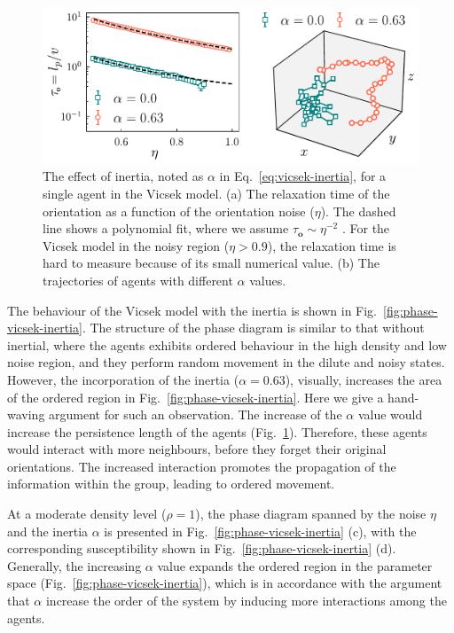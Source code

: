 \documentclass[11pt,twoside]{report}
\begin{document}
\begin{figure}
  \includegraphics[width=\linewidth]{vicsek-inertia}
  \caption[The effect of inertia in the Vicsek model]{
	The effect of inertia, noted as $\alpha$ in Eq.~\ref{eq:vicsek-inertia}, for a single agent in the Vicsek model.
	(a) The relaxation time of the orientation as a function of the orientation noise ($\eta$). The dashed line shows a polynomial fit, where we assume $\tau_\mathbf{o} \sim \eta^{-2}$ \cite{ginelli2016}. For the Vicsek model in the noisy region ($\eta > 0.9$), the relaxation time is hard to measure because of its small numerical value.
	(b) The trajectories of agents with different $\alpha$ values.
  }
  \label{fig:vicsek-inertia}
\end{figure}


The behaviour of the Vicsek model with the inertia is shown in Fig.~\ref{fig:phase-vicsek-inertia}. The structure of the phase diagram
is similar to that without inertial, where the agents exhibits ordered behaviour in the high density and low noise region, and they perform random movement in the dilute and noisy states. However, the incorporation of the inertia ($\alpha = 0.63$), visually, increases the area of the ordered region in Fig.~\ref{fig:phase-vicsek-inertia}.
Here we give a hand-waving argument for such an observation. The increase of the $\alpha$ value would increase the persistence length of the agents (Fig.~\ref{fig:vicsek-inertia}). Therefore, these agents would interact with more neighbours, before they forget their original orientations. The increased interaction promotes the propagation of the information within the group, leading to ordered movement.


At a moderate density level ($\rho = 1$), the phase diagram spanned by the noise $\eta$ and the inertia $\alpha$ is presented in Fig.~\ref{fig:phase-vicsek-inertia} (c), with the corresponding susceptibility shown in Fig.~\ref{fig:phase-vicsek-inertia} (d). Generally, the increasing $\alpha$ value expands the ordered region in the parameter space (Fig.~\ref{fig:phase-vicsek-inertia}), which is in accordance with the argument that $\alpha$ increase the order of the system by inducing more interactions among the agents.%
\end{document}
